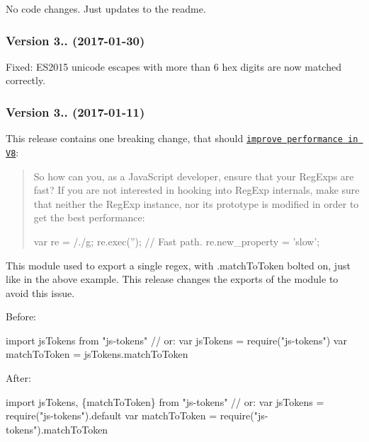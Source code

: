 
\begin{DoxyItemize}
\item No code changes. Just updates to the readme.
\end{DoxyItemize}

\subsubsection*{Version 3.. (2017-\/01-\/30)}


\begin{DoxyItemize}
\item Fixed\+: E\+S2015 unicode escapes with more than 6 hex digits are now matched correctly.
\end{DoxyItemize}

\subsubsection*{Version 3.. (2017-\/01-\/11)}

This release contains one breaking change, that should \href{http://v8project.blogspot.se/2017/01/speeding-up-v8-regular-expressions.html}{\tt improve performance in V8}\+:

\begin{quote}
So how can you, as a Java\+Script developer, ensure that your Reg\+Exps are fast? If you are not interested in hooking into Reg\+Exp internals, make sure that neither the Reg\+Exp instance, nor its prototype is modified in order to get the best performance\+:


\begin{DoxyCode}
var re = /./g;
re.exec('');  // Fast path.
re.new\_property = 'slow';
\end{DoxyCode}
 \end{quote}


This module used to export a single regex, with {\ttfamily .match\+To\+Token} bolted on, just like in the above example. This release changes the exports of the module to avoid this issue.

Before\+:


\begin{DoxyCode}
import jsTokens from "js-tokens"
// or:
var jsTokens = require("js-tokens")
var matchToToken = jsTokens.matchToToken
\end{DoxyCode}


After\+:


\begin{DoxyCode}
import jsTokens, \{matchToToken\} from "js-tokens"
// or:
var jsTokens = require("js-tokens").default
var matchToToken = require("js-tokens").matchToToken
\end{DoxyCode}



